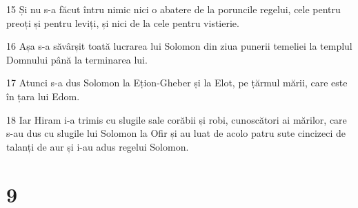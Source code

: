 \par 15 Și nu s-a făcut întru nimic nici o abatere de la poruncile regelui, cele pentru preoți și pentru leviți, și nici de la cele pentru vistierie.
\par 16 Așa s-a săvârșit toată lucrarea lui Solomon din ziua punerii temeliei la templul Domnului până la terminarea lui.
\par 17 Atunci s-a dus Solomon la Ețion-Gheber și la Elot, pe țărmul mării, care este în țara lui Edom.
\par 18 Iar Hiram i-a trimis cu slugile sale corăbii și robi, cunoscători ai mărilor, care s-au dus cu slugile lui Solomon la Ofir și au luat de acolo patru sute cincizeci de talanți de aur și i-au adus regelui Solomon.

\chapter{9}

